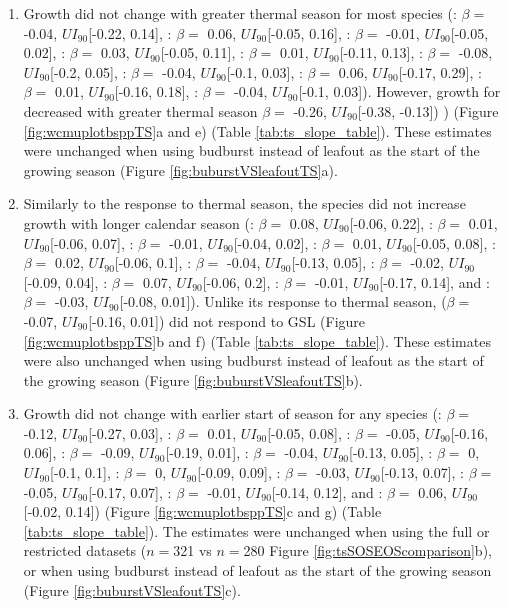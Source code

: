 \documentclass{article}\usepackage[]{graphicx}\usepackage[]{xcolor}
\begin{document}
\begin{enumerate}

\item Growth did not change with greater thermal season for most species 
(\Arub: $\beta = $ -0.04, $UI_{90}$[-0.22, 0.14],
\Asac: $\beta = $
0.06, $UI_{90}$[-0.05,
0.16],
\Afla: $\beta = $
-0.01, $UI_{90}$[-0.05,
0.02],
\Bnig: $\beta = $
0.03, $UI_{90}$[-0.05,
0.11],
\Cgla: $\beta = $
0.01, $UI_{90}$[-0.11,
0.13],
\Cova: $\beta = $
-0.08, $UI_{90}$[-0.2,
0.05],
\Pdel: $\beta = $
-0.04, $UI_{90}$[-0.1,
0.03],
\Qalb: $\beta = $
0.06, $UI_{90}$[-0.17,
0.29],
\Qrub: $\beta = $
0.01, $UI_{90}$[-0.16,
0.18],
\Tame: $\beta = $
-0.04, $UI_{90}$[-0.1,
0.03]). 
However, growth for {\Ball} decreased with greater thermal season 
$\beta = $ -0.26, 
$UI_{90}$[-0.38,
-0.13])
) (Figure \ref{fig:wcmuplotbsppTS}a and e) (Table \ref{tab:ts_slope_table}). 
These estimates were unchanged when using budburst instead of leafout as  the start of the growing season (Figure \ref{fig:buburstVSleafoutTS}a).
 
\item Similarly to the response to thermal season, the species did not increase growth with longer calendar season 
(\Arub: $\beta = $ 0.08, $UI_{90}$[-0.06, 0.22],
\Asac: $\beta = $
0.01, $UI_{90}$[-0.06,
0.07],
\Afla: $\beta = $
-0.01, $UI_{90}$[-0.04,
0.02],
\Bnig: $\beta = $
0.01, $UI_{90}$[-0.05,
0.08],
\Cgla: $\beta = $
0.02, $UI_{90}$[-0.06,
0.1],
\Cova: $\beta = $
-0.04, $UI_{90}$[-0.13,
0.05],
\Pdel: $\beta = $
-0.02, $UI_{90}$[-0.09,
0.04],
\Qalb: $\beta = $
0.07, $UI_{90}$[-0.06,
0.2],
\Qrub: $\beta = $
-0.01, $UI_{90}$[-0.17,
0.14], and
\Tame: $\beta = $
-0.03, $UI_{90}$[-0.08,
0.01]). 
Unlike its response to thermal season, \Ball ($\beta = $
-0.07, $UI_{90}$[-0.16,
0.01]) did not respond to GSL (Figure \ref{fig:wcmuplotbsppTS}b and f) (Table \ref{tab:ts_slope_table}). 
These estimates were also unchanged when using budburst instead of leafout as  the start of the growing season (Figure \ref{fig:buburstVSleafoutTS}b).

\item Growth did not change with earlier start of season for any species
(\Arub: $\beta = $ -0.12, $UI_{90}$[-0.27, 0.03],
\Asac: $\beta = $
0.01, $UI_{90}$[-0.05,
0.08],
\Afla: $\beta = $
-0.05, $UI_{90}$[-0.16,
0.06],
\Ball: $\beta = $
-0.09, $UI_{90}$[-0.19,
0.01],
\Bnig: $\beta = $
-0.04, $UI_{90}$[-0.13,
0.05],
\Cgla: $\beta = $
0, $UI_{90}$[-0.1,
0.1],
\Cova: $\beta = $
0, $UI_{90}$[-0.09,
0.09],
\Pdel: $\beta = $
-0.03, $UI_{90}$[-0.13,
0.07],
\Qalb: $\beta = $
-0.05, $UI_{90}$[-0.17,
0.07],
\Qrub: $\beta = $
-0.01, $UI_{90}$[-0.14,
0.12], and
\Tame: $\beta = $
0.06, $UI_{90}$[-0.02,
0.14])
(Figure \ref{fig:wcmuplotbsppTS}c and g) (Table \ref{tab:ts_slope_table}). 
The estimates were unchanged when using the full or restricted datasets ($n =$321 vs $n=$280 Figure \ref{fig:tsSOSEOScomparison}b), or when using budburst instead of leafout as the start of the growing season (Figure \ref{fig:buburstVSleafoutTS}c).


\end{enumerate}
\end{document}

